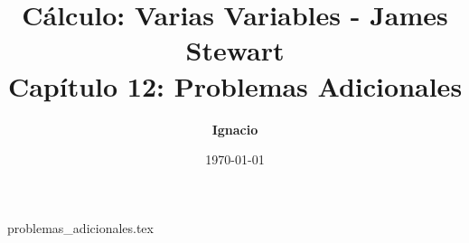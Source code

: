 \documentclass[11pt,spanish,oneside]{report}
\title{\textbf{Cálculo: Varias Variables - James Stewart} \\ \Large Capítulo 12: Problemas Adicionales}
\author{\textbf{Ignacio}}
\date{\today}
\begin{document}
\maketitle

{problemas_adicionales.tex}
\end{document}

